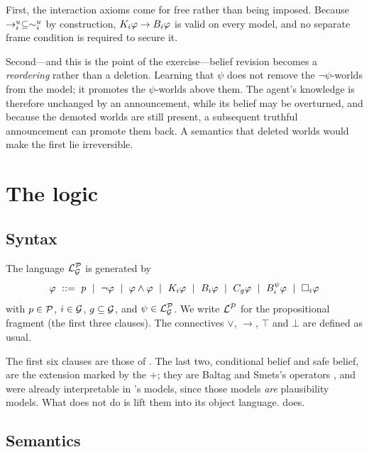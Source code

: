 \documentclass[11pt,a4paper]{article}
\begin{document}
First, the interaction axioms come for free rather than being imposed. Because $\rightarrow_{i}^{u}
\subseteq \sim_{i}^{u}$ by construction, $K_{i}\varphi \to B_{i}\varphi$ is valid on every
model, and no separate frame condition is required to secure it.

Second---and this is the point of the exercise---belief revision becomes a \emph{reordering}
rather than a deletion. Learning that $\psi$ does not remove the $\neg\psi$-worlds from the
model; it promotes the $\psi$-worlds above them. The agent's knowledge is therefore unchanged
by an announcement, while its belief may be overturned, and because the demoted worlds are
still present, a subsequent truthful announcement can promote them back. A semantics that
deleted worlds would make the first lie irreversible.

\section{The logic \mBplus}
\label{sec:logic}

\subsection{Syntax}

\begin{definition}
\label{def:syntax}
The language $\mathcal{L}^{\mathcal{P}}_{\mathcal{G}}$ is generated by
\[
  \varphi \ ::=\ p \ \mid\ \neg\varphi \ \mid\ \varphi \wedge \varphi
    \ \mid\ \Kop{i}\varphi \ \mid\ \Bop{i}\varphi \ \mid\ \Cop{g}\varphi
    \ \mid\ \CBop{i}{\psi}\varphi \ \mid\ \Sop{i}\varphi
\]
with $p \in \mathcal{P}$, $i \in \mathcal{G}$, $g \subseteq \mathcal{G}$, and $\psi \in \mathcal{L}^{\mathcal{P}}_{\mathcal{G}}$. We write $\mathcal{L}^{\mathcal{P}}$
for the propositional fragment (the first three clauses). The connectives $\vee$,
$\rightarrow$, $\top$ and $\bot$ are defined as usual.
\end{definition}

The first six clauses are those of \mB{} \citep[Def.~1]{buckingham2021thesis}. The last two,
conditional belief and safe belief, are the extension marked by the $+$; they are Baltag and
Smets's operators \citep{baltag2006,baltag2008}, and were already interpretable in \mB's
models, since those models \emph{are} plausibility models. What \mB{} does not do is lift them
into its object language. \mBplus{} does.

\subsection{Semantics}
\end{document}
